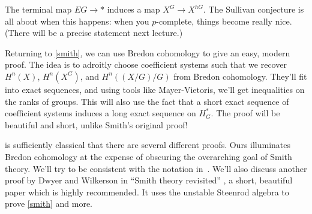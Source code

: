 The terminal map $EG\to *$ induces a map $X^G\to X^{hG}$. The Sullivan conjecture is all about when this happens:
when you $p$-complete, things become really nice. (There will be a precise statement next lecture.)

Returning to \cref{smith}, we can use Bredon cohomology to give an easy, modern proof. The idea is to adroitly
choose coefficient systems such that we recover $H^n(X)$, $H^n(X^G)$, and $H^n((X/G)/G)$ from Bredon cohomology.
They'll fit into exact sequences, and using tools like Mayer-Vietoris, we'll get inequalities on the ranks of
groups. This will also use the fact that a short exact sequence of coefficient systems induces a long exact
sequence on $H_G^*$. The proof will be beautiful and short, unlike Smith's original proof!

 is sufficiently classical that there are several different proofs. Ours illuminates Bredon cohomology
at the expense of obscuring the overarching goal of Smith theory. We'll try to be consistent with the notation
in~\cite{MaySmithTheory, AlaskaNotes}. We'll also discuss another proof by Dwyer and Wilkerson in ``Smith theory
revisited'' \cite{SmithRevisit}, a short, beautiful paper which is highly recommended. It uses the unstable
Steenrod algebra to prove \cref{smith} and more.
